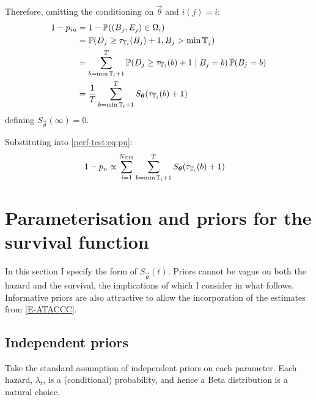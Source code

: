 \documentclass[thesis.tex]{subfiles}
\begin{document}
Therefore, omitting the conditioning on $\vec{\theta}$ and $i(j) = i$:
\begin{align}
1 - p_{iu}
&= 1 - \operatorname{\mathbb{P}}((B_{j}, E_{j}) \in \Omega_i) \\
&= \operatorname{\mathbb{P}}(D_j \geq \tau_{\mathbb{T}_{i}}(B_j)+ 1, B_j > \min \mathbb{T}_{j}) \\
&= \sum_{b = \min \mathbb{T}_{i} + 1}^T \operatorname{\mathbb{P}}(D_j \geq \tau_{\mathbb{T}_{i}}(b) + 1 \mid B_j = b) \operatorname{\mathbb{P}}(B_j = b)\\
&= \frac{1}{T} \sum_{b = \min \mathbb{T}_{i} + 1}^T S_{\bm{\theta}}(\tau_{\mathbb{T}_{i}}(b) + 1)
\end{align}
defining $S_{\vec{\theta}}(\infty) = 0$.

Substituting into \cref{perf-test:eq:pu}:
\begin{align}
1 - p_u
& \propto \sum_{i=1}^{N_\text{CIS}} \sum_{b = \min \mathbb{T}_{i} + 1}^T S_{\bm{\theta}}(\tau_{\mathbb{T}_{i}}(b) + 1)
\end{align}

\section{Parameterisation and priors for the survival function} \label{perf-test:sec:parameters-priors}

In this section I specify the form of $S_{\vec{\theta}}(t)$.
Priors cannot be vague on both the hazard and the survival, the implications of which I consider in what follows.
Informative priors are also attractive to allow the incorporation of the estimates from \cref{E-ATACCC}.

\subsection{Independent priors} \label{perf-test:sec:independent-priors}
Take the standard assumption of independent priors on each parameter.
Each hazard, $\lambda_t$, is a (conditional) probability, and hence a Beta distribution is a natural choice.
\end{document}
